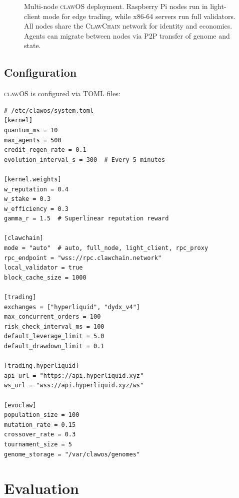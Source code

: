 \documentclass{article}
\newcommand{\clawos}{\textsc{clawOS}}
\newcommand{\clawchain}{\textsc{ClawChain}}
\begin{document}
\begin{figure}[t]
\caption{Multi-node \clawos{} deployment. Raspberry Pi nodes run in light-client mode for edge trading, while x86-64 servers run full validators. All nodes share the \clawchain{} network for identity and economics. Agents can migrate between nodes via P2P transfer of genome and state.}
\label{fig:deployment}
\end{figure}

\subsection{Configuration}

\clawos{} is configured via TOML files:

\begin{lstlisting}[style=tomlcode, caption={Example \clawos{} configuration.}, label={lst:config}]
# /etc/clawos/system.toml
[kernel]
quantum_ms = 10
max_agents = 500
credit_regen_rate = 0.1
evolution_interval_s = 300  # Every 5 minutes

[kernel.weights]
w_reputation = 0.4
w_stake = 0.3
w_efficiency = 0.3
gamma_r = 1.5  # Superlinear reputation reward

[clawchain]
mode = "auto"  # auto, full_node, light_client, rpc_proxy
rpc_endpoint = "wss://rpc.clawchain.network"
local_validator = true
block_cache_size = 1000

[trading]
exchanges = ["hyperliquid", "dydx_v4"]
max_concurrent_orders = 100
risk_check_interval_ms = 100
default_leverage_limit = 5.0
default_drawdown_limit = 0.1

[trading.hyperliquid]
api_url = "https://api.hyperliquid.xyz"
ws_url = "wss://api.hyperliquid.xyz/ws"

[evoclaw]
population_size = 100
mutation_rate = 0.15
crossover_rate = 0.3
tournament_size = 5
genome_storage = "/var/clawos/genomes"
\end{lstlisting}

%
%

\section{Evaluation}
\label{sec:evaluation}
\end{document}
